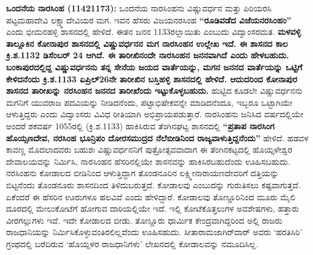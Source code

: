 \textbf{ಒಂದನೆಯ ನಾರಸಿಂಹ (1142\general{\enginline{-}}1173):} ಒಂದನೆಯ ನಾರಸಿಂಹನು ವಿಷ್ಣುವರ್ಧನ ಮತ್ತು ಪಿರಿಯರಸಿ ಪಟ್ಟಮಹಾದೇವಿ ಲಕ್ಷ್ಮಾದೇವಿಯರ ಮಗ. ಇವನ ಹೆಸರು ವಿಜಯನರಸಿಂಹ \textbf{“ರೂಡಿವಡೆದ ವಿಜೆಯನರಸಿಂಹಂ”} ಎಂದು ಭೀಮನಹಳ್ಳಿ ಶಾಸನದಲ್ಲಿ ಹೇಳಿದೆ. ಈತನ ಜನನ 1133ರಲ್ಲಾಯಿತು ಎಂಬುದು ವಿದ್ವಾಂಸರಮತ.\textbf{ ಮಳವಳ್ಳಿ ತಾಲ್ಲೂಕಿನ ಕೋನಾಪುರ ಶಾಸನದಲ್ಲಿ ವಿಷ್ಣುವರ್ಧನನ ಮಗ ನಾರಸಿಂಹನ ಉಲ್ಲೇಖ ಇದೆ. ಈ ಶಾಸನದ ಕಾಲ ಕ್ರಿ.ಶ.1132 ಡಿಸೆಂಬರ್​ 24 ಆಗಿದೆ. ಈ ತಾರೀಖಿನಂದೇ ನಾರಸಿಂಹನ ಜನನವಾಗಿದೆ ಎಂದು ಹೇಳಬಹುದು.} \textbf{ಬಂಕಾಪುರದಲ್ಲಿದ್ದ ವಿಷ್ಣುವರ್ಧನನು ತನ್ನ ಸೇನೆಯ ಜಯದ ವಾರ್ತೆಯನ್ನು, ಮಗನ ಜನನದ ವಾರ್ತೆಯನ್ನು ಒಟ್ಟಿಗೆ ಕೇಳಿದನೆಂದು ಕ್ರಿ.ಶ.1133 ಏಪ್ರಿಲ್​ 26ನೇ ತಾರೀಖಿನ ಬಸ್ತಿಹಳ್ಳಿ ಶಾಸನದಲ್ಲಿ ಹೇಳಿದೆ. ಆದುದರಿಂದ ಕೋನಾಪುರ ಶಾಸನದ ತಾರೀಖನ್ನು ನರಸಿಂಹನ ಜನನದ ತಾರೀಖೆಂದು ಇಟ್ಟುಕೊಳ್ಳಬಹುದು.} ಹುಟ್ಟಿದ ಕೂಡಲೇ ವಿಷ್ಣುವರ್ಧನನು ಮಗನಿಗೆ ಯುವರಾಜ ಪದವಿಯನ್ನು ನೀಡಿದನೆಂದು, ಪಟ್ಟಾಭಿಷೇಕವನ್ನೇ ಮಾಡಿದನೆಂದೂ, ಇಬ್ಬರೂ ಒಟ್ಟಾಗಿಯೇ ಆಳುತ್ತಿದ್ದರು ಎಂದು ವಿದ್ವಾಂಸರು ವಿವಿಧ ರೀತಿಯಾಗಿ ಅಭಿಪ್ರಾಯಪಡುತ್ತಾರೆ. ನಾರಸಿಂಹನು ಜನಿಸಿದ ವರ್ಷದಲ್ಲಿಯೇ ಅಂದರೆ ಶಕವರ್ಷ 1055ರಲ್ಲಿ (ಕ್ರಿ.ಶ.1133) ಹಾಕಿಸಿರುವ ತೆಂಗಿನಘಟ್ಟ ಶಾಸನದಲ್ಲಿ \textbf{“ಪ್ರತಾಪ ನಾರಸಿಂಗ ಹೊಯ್ಸಣದೇವ, ನರಸಿಂಹ ಭೂನ್ರಿಪಂ ದೋರಸಮುದ್ರದ ನೆಲೆಬೀಡಿನಿಂದ ರಾಜ್ಯವಾಳುತ್ತಿದ್ದನೆಂದು”} ಹೇಳಿದೆ. ಹಡವಳ ಕಾವಣ್ಣ ಮೊದಲಾದವರು ಬಹುಶಃ ವಿಷ್ಣುವರ್ಧನನಿಗೆ ಪುತ್ರೋತ್ಸವವಾದಾಗ ಈ ತೆಂಗಿನಕಟ್ಟದಲ್ಲಿ ಹೊಯ್ಸಳೇಶ್ವರ ದೇವಾಲಯವನ್ನು ನಿರ್ಮಿಸಿ, ನಾರಸಿಂಹನ ಹೆಸರಿನಲ್ಲಿಯೇ ಶಾಸನವನ್ನು ಹಾಕಿಸಿರಬಹುದೆಂದು ಊಹಿಸಬಹುದು. ನರಸಿಂಹನು ಕೋಡಾಲದ ಬೀಡಿನಿಂದ ಆಳುತ್ತಿದ್ದಾಗ ತೊಂಡನೂರಿನ ಲಕ್ಷ್ಮೀನಾರಾಯಣದೇವರಿಗೆ ದತ್ತಿಯನ್ನು ಬಿಟ್ಟನೆಂದು ತೊಂಡನೂರು ಶಾಸನದಿಂದ ತಿಳಿದುಬರುತ್ತದೆ. ಕೋಡಾಲವು ಎಂಬುದನ್ನು ಗುರುತಿಸಲು ಕಷ್ಟವಾಗುತ್ತದೆ. ಏಕೆಂದರೆ ಈ ಹೆಸರಿನ ಊರುಗಳೂ ಹಲವಿವೆ ಎಂದು ಹೇಳಿದ್ದಾರೆ. ಕೋಡಾಲವು ತೊಣ್ಣೂರಿನಿಂದ ಮೂರು ಮೈಲಿ ದೂರದಲ್ಲಿ ಮೇಲುಕೋಟೆಗೆ ಹೋಗುವ ದಾರಿಯಲ್ಲಿಯೇ ಇದೆ. ಇಲ್ಲಿ ಕೋಟೆಕೊತ್ತಲುಗಳ ಅವಶೇಷಗಳು, ಹತ್ತಾರು ವೀರಗಲ್ಲುಗಳು ಇವೆ. ಇದೇ ಕೋಡಾಲದ ಬೀಡು. ತೊಣ್ಣೂರು ಧಾರ್ಮಿಕ ಕೇಂದ್ರವಾಗಿದ್ದರಿಂದ ಅಲ್ಲಿ ರಾಜರು ರಾಜಧಾನಿಯನ್ನು ನಿರ್ಮಿಸಿಕೊಳ್ಳುವಂತಿರ\-ಲಿಲ್ಲವೆಂದು ಊಹಿಸಹುದು. ಸೀತಾರಾಮಜಾಗಿರ್​ದಾರ್​ ಅವರು `ಹರತಿಸಿರಿ' ಗ್ರಂಥದಲ್ಲಿ ಬರೆದಿರುವ ‘ಹೊಯ್ಸಳರ ರಾಜಧಾನಿಗಳು’ ಲೇಖನದಲ್ಲಿ ಕೋಡಾಲವನ್ನು ನಮೂದಿಸಿಲ್ಲ.

